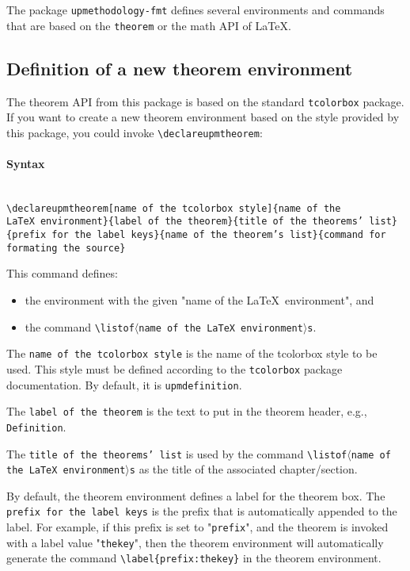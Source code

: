 \documentclass[book,taskpackage,specpackage,codepackage]{upmethodology-document}
\begin{document}
The package \texttt{upmethodology-fmt} defines several environments and commands that are based on the \texttt{theorem} or the math API of \LaTeX.

\subsection{Definition of a new theorem environment}

The theorem API from this package is based on the standard \texttt{tcolorbox} package.
If you want to create a new theorem environment based on the style provided by this package, you could invoke \texttt{{\textbackslash}declareupmtheorem}:

\paragraph{Syntax} \mbox{}\\
\texttt{{\textbackslash}declareupmtheorem[name of the tcolorbox style]\{name of the \LaTeX\ environment\}\{label of the theorem\}\{title of the theorems' list\}\{prefix for the label keys\}\{name of the theorem's list\}\{command for formating the source\}}

This command defines:
\begin{itemize}
\item the environment with the given "name of the \LaTeX\ environment", and
\item the command \texttt{{\textbackslash}listof$\langle$name of the \LaTeX\ environment$\rangle$s}.
\end{itemize}

The \texttt{name of the tcolorbox style} is the name of the tcolorbox style to be used. This style must be defined according to the \texttt{tcolorbox} package documentation. By default, it is \texttt{upmdefinition}.

The \texttt{label of the theorem} is the text to put in the theorem header, e.g., \texttt{Definition}.

The \texttt{title of the theorems' list} is used by the command \texttt{{\textbackslash}listof$\langle$name of the \LaTeX\ environment$\rangle$s} as the title of the associated chapter/section.

By default, the theorem environment defines a label for the theorem box. The \texttt{prefix for the label keys} is the prefix that is automatically appended to the label. For example, if this prefix is set to "\texttt{prefix}", and the theorem is invoked with a label value "\texttt{thekey}", then the theorem environment will automatically generate the command \texttt{{\textbackslash}label\{prefix:thekey\}} in the theorem environment.
\end{document}
